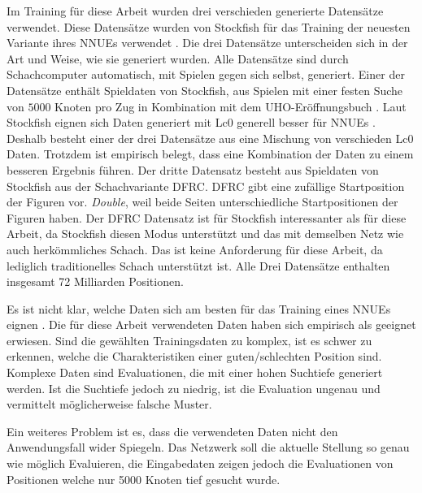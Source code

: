 Im Training für diese Arbeit wurden drei verschieden generierte Datensätze verwendet. Diese Datensätze wurden von Stockfish für das Training der neuesten Variante ihres \acp{NNUE} verwendet \cite{StockfishNewestNetJul04}. Die drei Datensätze unterscheiden sich in der Art und Weise, wie sie generiert wurden. Alle Datensätze sind durch Schachcomputer automatisch, mit Spielen gegen sich selbst, generiert. Einer der Datensätze enthält Spieldaten von Stockfish, aus Spielen mit einer festen Suche von $5000$ Knoten pro Zug in Kombination mit dem \ac{UHO}-Eröffnungsbuch \cite{Pohl2021}. Laut Stockfish eignen sich Daten generiert mit \ac{Lc0} generell besser für \acp{NNUE} \cite{StockfishTrainingDataWiki}. Deshalb besteht einer der drei Datensätze aus eine Mischung von verschieden \ac{Lc0} Daten. Trotzdem ist empirisch belegt, dass eine Kombination der Daten zu einem besseren Ergebnis führen. Der dritte Datensatz besteht aus Spieldaten von Stockfish aus der Schachvariante \ac{DFRC}. \ac{DFRC} gibt eine zufällige Startposition der Figuren vor. \emph{Double}, weil beide Seiten unterschiedliche Startpositionen der Figuren haben. Der \ac{DFRC} Datensatz ist für Stockfish interessanter als für diese Arbeit, da Stockfish diesen Modus unterstützt und das mit demselben Netz wie auch herkömmliches Schach. Das ist keine Anforderung für diese Arbeit, da lediglich traditionelles Schach unterstützt ist. Alle Drei Datensätze enthalten insgesamt 72 Milliarden Positionen.

Es ist nicht klar, welche Daten sich am besten für das Training eines \acp{NNUE} eignen \cite{StockfishNNUE}. Die für diese Arbeit verwendeten Daten haben sich empirisch als geeignet erwiesen. Sind die gewählten Trainingsdaten zu komplex, ist es schwer zu erkennen, welche die Charakteristiken einer guten/schlechten Position sind. Komplexe Daten sind Evaluationen, die mit einer hohen Suchtiefe generiert werden. Ist die Suchtiefe jedoch zu niedrig, ist die Evaluation ungenau und vermittelt möglicherweise falsche Muster.

Ein weiteres Problem ist es, dass die verwendeten Daten nicht den Anwendungsfall wider Spiegeln. Das Netzwerk soll die aktuelle Stellung so genau wie möglich Evaluieren, die Eingabedaten zeigen jedoch die Evaluationen von Positionen welche \zb{} nur 5000 Knoten tief gesucht wurde.

